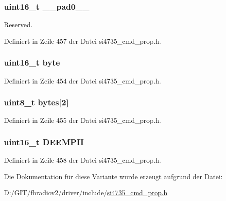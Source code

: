 \subsubsection[{\+\_\+\+\_\+pad0\+\_\+\+\_\+}]{\setlength{\rightskip}{0pt plus 5cm}uint16\+\_\+t \+\_\+\+\_\+pad0\+\_\+\+\_\+}\label{unionfm__deemphasis_a77132c2c26a75f5b8751b235cda23828}


Reserved. 



Definiert in Zeile 457 der Datei si4735\+\_\+cmd\+\_\+prop.\+h.

\hypertarget{unionfm__deemphasis_ab0549c1b5ea980a02e7eab77e21fea49}{}
\subsubsection[{byte}]{\setlength{\rightskip}{0pt plus 5cm}uint16\+\_\+t byte}\label{unionfm__deemphasis_ab0549c1b5ea980a02e7eab77e21fea49}


Definiert in Zeile 454 der Datei si4735\+\_\+cmd\+\_\+prop.\+h.

\hypertarget{unionfm__deemphasis_a46e4c05d20a047ec169f60d3167e912e}{}
\subsubsection[{bytes}]{\setlength{\rightskip}{0pt plus 5cm}uint8\+\_\+t bytes\mbox{[}2\mbox{]}}\label{unionfm__deemphasis_a46e4c05d20a047ec169f60d3167e912e}


Definiert in Zeile 455 der Datei si4735\+\_\+cmd\+\_\+prop.\+h.

\hypertarget{unionfm__deemphasis_abc844751c522212f064b9e723213950f}{}
\subsubsection[{D\+E\+E\+M\+P\+H}]{\setlength{\rightskip}{0pt plus 5cm}uint16\+\_\+t D\+E\+E\+M\+P\+H}\label{unionfm__deemphasis_abc844751c522212f064b9e723213950f}


Definiert in Zeile 458 der Datei si4735\+\_\+cmd\+\_\+prop.\+h.



Die Dokumentation für diese Variante wurde erzeugt aufgrund der Datei\+:\begin{DoxyCompactItemize}
\item 
D\+:/\+G\+I\+T/fhradiov2/driver/include/\hyperlink{si4735__cmd__prop_8h}{si4735\+\_\+cmd\+\_\+prop.\+h}\end{DoxyCompactItemize}
